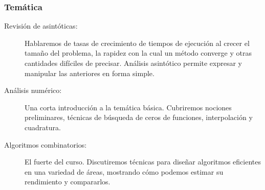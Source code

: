 \documentclass[english, spanish, fleqn%
hyperref = {colorlinks, urlcolor = blue}%
]{beamer}
\begin{document}
\begin{frame}
  \setcounter{beamerpauses}{2}
  \frametitle{Temática}

  \begin{description}
  \item[Revisión de asintóticas:]
    Hablaremos de tasas de crecimiento de tiempos de ejecución
    al crecer el tamaño del problema,
    la rapidez con la cual un método converge
    y otras cantidades difíciles de precisar.
    Análisis asintótico permite expresar y manipular
    las anteriores en forma simple.
  \item[Análisis numérico:]
    Una corta introducción a la temática básica.
    Cubriremos nociones preliminares,
    técnicas de búsqueda de ceros de funciones,
    interpolación y cuadratura.
  \item[Algoritmos combinatorios:]
    El fuerte del curso.
    Discutiremos técnicas para diseñar algoritmos eficientes
    en una variedad de áreas,
    mostrando cómo podemos estimar su rendimiento
    y compararlos.
  \end{description}
\end{frame}
\end{document}
